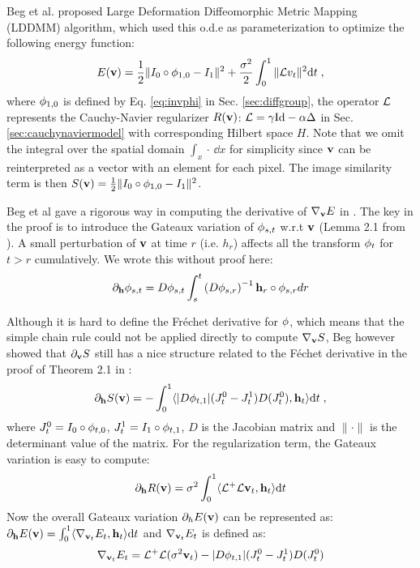 \documentclass[letterpaper,12pt]{article}
\begin{document}
Beg et al. proposed Large Deformation Diffeomorphic Metric Mapping (LDDMM) algorithm, which used this o.d.e as parameterization to optimize the following energy function:
\begin{align}
E(\mathbf{v}) = \frac{1}{2} \| I_0 \circ \phi_{1,0} - I_1 \|^2 
+ 
\frac{\sigma^2}{2}\int_{0}^{1} \| \mathcal{L} v_t\|^2 \text{d} t \;,
\label{eq:lddmm}
\end{align}
where $\phi_{1,0}$ is defined by Eq. \ref{eq:invphi} in
Sec. \ref{sec:diffgroup}, the operator $\mathcal{L}$ represents the
Cauchy-Navier regularizer $R(\mathbf{v})$: $\mathcal{L} = \gamma \text{Id} - \alpha \Delta$
in Sec. \ref{sec:cauchynaviermodel} with corresponding Hilbert space
$H$. Note that we omit the integral over the spatial domain $\int_x
\cdot\, \dd x$ for simplicity since $\mathbf{v}$ can be reinterpreted as a
vector with an element for each pixel. The image similarity term is
then $S(\mathbf{v}) = \frac{1}{2} \| I_0 \circ \phi_{1,0} - I_1 \|^2 $.

Beg et al gave a rigorous way in computing the derivative of $\nabla_{\mathbf{v}} E$ in \cite{Beg2005Computing}. The key in the proof is to introduce the Gateaux variation of $\phi_{s,t}$ w.r.t $\mathbf{v}$ (Lemma 2.1 from \cite{Beg2005Computing}). A small perturbation of $\mathbf{v}$ at time $r$ (i.e. $h_r$) affects all the transform $\phi_t$ for $t>r$ cumulatively. 
We wrote this without proof here:
\begin{align}
\partial_{\mathbf{h}} \phi_{s,t} = D\phi_{s,t} 
\int_{s}^{t} 
\left( 
D \phi_{s,r}
\right)
^{-1} \mathbf{h}_r \circ \phi_{s, r} dr
\end{align}

Although it is hard to define the Fr{\'e}chet derivative for $\phi$, which means that the simple chain rule could not be applied directly to compute $\nabla_{\mathbf{v}} S$, Beg however showed that $\partial_{\mathbf{v}} S$ still has a nice structure related to the F\'echet derivative in the proof of Theorem 2.1 in \cite{Beg2005Computing}:
\begin{align}
\partial_{\mathbf{h}} S(\mathbf{v}) = - \int_{0}^{1} 
\langle
|D\phi_{t,1}|
(J_t^0 - J_t^1)
D(J_t^0)
,
\mathbf{h}_t
\rangle
\text{d} t \; ,
\label{eq:lddmmds}
\end{align}
where $J_t^0 = I_{0}\circ \phi_{t,0}$, $J_t^1 = I_{1}\circ \phi_{t,1}$, $D$ is the Jacobian matrix and $\| \cdot \|$ is the determinant value of the matrix.
For the regularization term, the Gateaux variation is easy to compute:
\begin{align}
\partial_{\mathbf{h}} R(\mathbf{v}) = \sigma^2 \int_{0}^{1} 
\langle
\mathcal{L}^+\mathcal{L} \mathbf{v}_t, \mathbf{h}_t
\rangle \text{d} t
\end{align}
Now the overall Gateaux variation $\partial_h E(\mathbf{v})$ can be represented as:
$\partial_{\mathbf{h}} E(\mathbf{v}) = \int_0^1
\langle
\nabla_{\mathbf{v}_t} E_t , \mathbf{h}_t
\rangle \text{d} t $
and $\nabla_{\mathbf{v}_t} E_t$ is defined as:
\begin{align}
\nabla_{\mathbf{v}_t} E_t = \mathcal{L}^+\mathcal{L} (\sigma^2 \mathbf{v}_t) - |D\phi_{t,1}|(J_t^0 - J_t^1)D(J_t^0)
\label{eq:lddmmgrad}
\end{align}
\end{document}
